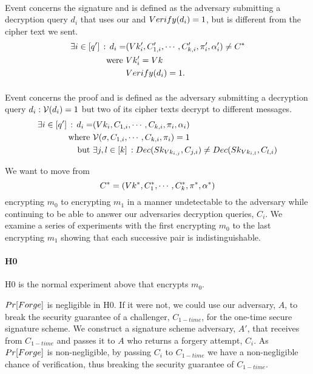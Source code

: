 \paragraph{\Forge} Event \Forge concerns the signature and
is defined as the adversary submitting a decryption query $d_i$
that uses our \Vk and $Verify(d_i) = 1$, but is different from the cipher text we sent.
\begin{align*}
\exists i \in [q'] \, : \, d_i =& (Vk_i', C_{1,i}', \cdots, C_{k,i}', \pi_i', \alpha_i')  \neq C^*\\
\text{were } & Vk_i' = Vk \\
                   & Verify(d_i) = 1.
\end{align*}

\paragraph{\Fake} Event \Fake concerns the proof and
is defined as the adversary submitting a decryption query $d_i : \mathcal{V}(d_i) = 1$
 but two of its cipher texts decrypt to different messages.
\begin{align*}
   \exists i \in [q'] \, : \, d_i = & (Vk_i, C_{1,i}, \cdots, C_{k,i}, \pi_i, \alpha_i)  \\
\text {where }  & \mathcal{V}(\sigma, C_{1,i}, \cdots, C_{k,i}, \pi_i) = 1 \\
\text {but }       & \exists j,l \in [k] \, :
                         Dec(Sk_{Vk_{i,j}}, C_{j,i}) \neq  Dec(Sk_{Vk_{i,l}}, C_{l,i})
\end{align*}

We want to move from
\[
C^* = (Vk^*, C_1^*, \cdots, C_k^*, \pi^*, \alpha^*)
\]
encrypting $m_0$ to encrypting $m_1$ in a manner undetectable to the adversary while continuing to be able to answer our adversaries decryption queries, $C_i$.
We examine a series of experiments with the first encrypting $m_0$ to the last encrypting $m_1$
showing that each successive pair is indistinguishable.

\paragraph{H0} H0 is the normal experiment above that encrypts $m_0$.

$Pr[Forge]$  is negligible in H0. If it were not,
 we could use our adversary, $A$, to break the security guarantee of a challenger,
$C_{1-time}$, for the one-time secure signature scheme.
We construct a signature scheme adversary, $A'$, that receives \Vk from $C_{1-time}$ and passes it to $A$ who returns
a forgery attempt, $C_i$.
As $Pr[Forge]$ is non-negligible, by passing $C_i$ to $C_{1-time}$ we have a non-negligible chance of verification,
thus breaking the security guarantee of $C_{1-time}$.

